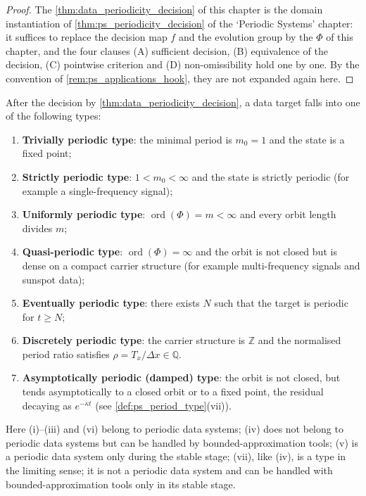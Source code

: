 \begin{proof}
The \cref{thm:data_periodicity_decision} of this chapter is the domain instantiation of \cref{thm:ps_periodicity_decision} of the `Periodic Systems' chapter:
it suffices to replace the decision map $f$ and the evolution group by the $\Phi$ of this chapter, and the four clauses (A) sufficient decision, (B) equivalence of the decision, (C) pointwise criterion and
(D) non-omissibility hold one by one. By the convention of \cref{rem:ps_applications_hook}, they are not expanded again here.
\end{proof}

\begin{corollary}\label{cor:data_period_type}
After the decision by \cref{thm:data_periodicity_decision}, a data target falls into one of the following types:
\begin{enumerate}[label=(\roman*)]
    \item \textbf{Trivially periodic type}: the minimal period is $m_0=1$ and the state is a fixed point;
    \item \textbf{Strictly periodic type}: $1<m_0<\infty$ and the state is strictly periodic (for example a single-frequency signal);
    \item \textbf{Uniformly periodic type}: $\operatorname{ord}(\Phi)=m<\infty$ and every orbit length divides $m$;
    \item \textbf{Quasi-periodic type}: $\operatorname{ord}(\Phi)=\infty$ and the orbit is not closed but is dense on a compact carrier structure (for example multi-frequency signals and sunspot data);
    \item \textbf{Eventually periodic type}: there exists $N$ such that the target is periodic for $t\ge N$;
    \item \textbf{Discretely periodic type}: the carrier structure is $\mathbb Z$ and the normalised period ratio satisfies $\rho=T_x/\Delta x\in\mathbb Q$.
    \item \textbf{Asymptotically periodic (damped) type}: the orbit is not closed, but tends asymptotically to a closed orbit or to a fixed point, the residual decaying as $e^{-\kappa t}$ (see \cref{def:ps_period_type}(vii)).
\end{enumerate}
Here (i)--(iii) and (vi) belong to periodic data systems; (iv) does not belong to periodic data systems but can be handled by bounded-approximation tools; (v) is a periodic data system only during the stable stage; (vii), like (iv), is a type in the limiting sense; it is not a periodic data system and can be handled with bounded-approximation tools only in its stable stage.
\end{corollary}


